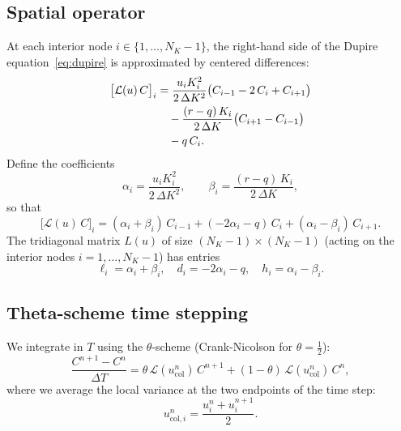 \documentclass[11pt, a4paper]{article}
\newcommand{\dK}{\Delta K}
\newcommand{\dT}{\Delta T}
\newcommand{\intOP}{\mathcal{L}}        %
\theoremstyle{definition}
\theoremstyle{plain}
\begin{document}
\subsection{Spatial operator}

At each interior node $i \in \{1, \ldots, N_K - 1\}$, the right-hand side
of the Dupire equation~\eqref{eq:dupire} is approximated by centered differences:
\begin{align}\label{eq:operator}
  \bigl[\intOP(u)\,C\bigr]_i
  &= \frac{u_i K_i^2}{2\,\dK^2}
     \bigl(C_{i-1} - 2\,C_i + C_{i+1}\bigr) \notag \\
  &\quad
  - \frac{(r-q)\,K_i}{2\,\dK}
     \bigl(C_{i+1} - C_{i-1}\bigr) \notag \\
  &\quad - q\, C_i.
\end{align}
Define the coefficients
\begin{equation}\label{eq:alphabeta}
  \alpha_i = \frac{u_i K_i^2}{2\,\dK^2}, \qquad
  \beta_i  = \frac{(r-q)\,K_i}{2\,\dK},
\end{equation}
so that
\begin{equation}\label{eq:opcoeffs}
  \bigl[\intOP(u)\,C\bigr]_i
  = (\alpha_i + \beta_i)\,C_{i-1}
  + (-2\alpha_i - q)\,C_i
  + (\alpha_i - \beta_i)\,C_{i+1}.
\end{equation}
The tridiagonal matrix $L(u)$ of size $(N_K-1) \times (N_K-1)$
(acting on the interior nodes $i = 1, \ldots, N_K-1$) has entries
\[
  \ell_i = \alpha_i + \beta_i,
  \quad
  d_i   = -2\alpha_i - q,
  \quad
  h_i   = \alpha_i - \beta_i.
\]

\subsection{Theta-scheme time stepping}

We integrate in $T$ using the $\theta$-scheme (Crank-Nicolson for
$\theta = \tfrac{1}{2}$):
\begin{equation}\label{eq:theta}
  \frac{C^{n+1} - C^n}{\dT}
  = \theta\,\intOP(u_\text{col}^n)\,C^{n+1}
    + (1-\theta)\,\intOP(u_\text{col}^n)\,C^n,
\end{equation}
where we average the local variance at the two endpoints of the time step:
\begin{equation}\label{eq:ucol}
  u_{\text{col},i}^n = \frac{u_i^n + u_i^{n+1}}{2}.
\end{equation}
\end{document}
